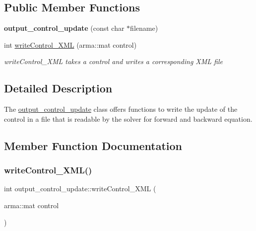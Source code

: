 \subsection*{Public Member Functions}
\begin{DoxyCompactItemize}
\item 
\mbox{\label{classoutput__control__update_a1e74afe80e283735d4392d8e58c81d40}} 
{\bfseries output\+\_\+control\+\_\+update} (const char $\ast$filename)
\item 
int \hyperlink{classoutput__control__update_a8261c07e1a6a3a34171ceecb93b27382}{write\+Control\+\_\+\+X\+ML} (arma\+::mat control)
\begin{DoxyCompactList}\small\item\em write\+Control\+\_\+\+X\+ML takes a control and writes a corresponding X\+ML file \end{DoxyCompactList}\end{DoxyCompactItemize}


\subsection{Detailed Description}
The \hyperlink{classoutput__control__update}{output\+\_\+control\+\_\+update} class offers functions to write the update of the control in a file that is readable by the solver for forward and backward equation. 

\subsection{Member Function Documentation}
\mbox{\label{classoutput__control__update_a8261c07e1a6a3a34171ceecb93b27382}} 
\subsubsection{\texorpdfstring{write\+Control\+\_\+\+X\+M\+L()}{writeControl\_XML()}}
{\footnotesize\ttfamily int output\+\_\+control\+\_\+update\+::write\+Control\+\_\+\+X\+ML (\begin{DoxyParamCaption}\item[{arma\+::mat}]{control }\end{DoxyParamCaption})}




